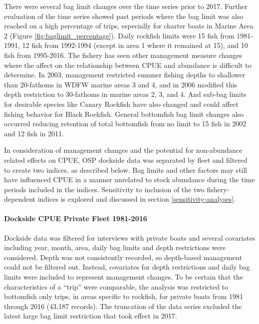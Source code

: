 \documentclass[11pt,
  english,
  letterpaper,
]{article}
\begin{document}
There were several bag limit changes over the time series prior to 2017. Further evaluation of the time series showed past periods where the bag limit was also reached on a high percentage of trips, especially for charter boats in Marine Area 2 (Figure \ref{fig:baglimit_percentage}). Daily rockfish limits were 15 fish from 1981-1991, 12 fish from 1992-1994 (except in area 1 where it remained at 15), and 10 fish from 1995-2016. The fishery has seen other management measure changes where the affect on the relationship between CPUE and abundance is difficult to determine. In 2003, management restricted summer fishing depths to shallower than 20-fathoms in WDFW marine areas 3 and 4, and in 2006 modified this depth restriction to 30-fathoms in marine areas 2, 3, and 4. And sub-bag limits for desirable species like Canary Rockfish have also changed and could affect fishing behavior for Black Rockfish. General bottomfish bag limit changes also occurred reducing retention of total bottomfish from no limit to 15 fish in 2002 and 12 fish in 2011.

In consideration of management changes and the potential for non-abundance related effects on CPUE, OSP dockside data was separated by fleet and filtered to create two indices, as described below. Bag limits and other factors may still have influenced CPUE in a manner unrelated to stock abundance during the time periods included in the indices. Sensitivity to inclusion of the two fishery-dependent indices is explored and discussed in section \ref{sensitivity-analyses}.

\hypertarget{dockside-cpue-private-fleet-1981-2016}{%
\paragraph{Dockside CPUE Private Fleet 1981-2016}\label{dockside-cpue-private-fleet-1981-2016}}

Dockside data was filtered for interviews with private boats and several covariates including year, month, area, daily bag limits and depth restrictions were considered. Depth was not consistently recorded, so depth-based management could not be filtered out. Instead, covariates for depth restrictions and daily bag limits were included to represent management changes. To be certain that the characteristics of a ``trip'' were comparable, the analysis was restricted to bottomfish only trips, in areas specific to rockfish, for private boats from 1981 through 2016 (43,187 records). The truncation of the data series excluded the latest large bag limit restriction that took effect in 2017.
\end{document}
